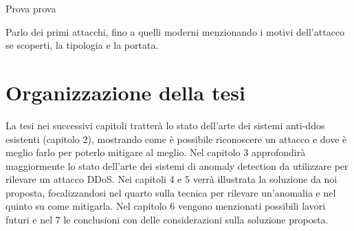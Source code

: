 
Prova prova

Parlo dei primi attacchi, fino a quelli moderni menzionando i motivi dell'attacco se scoperti, la tipologia e la portata.


\section{Organizzazione della tesi}

La tesi nei successivi capitoli tratterà lo stato dell'arte dei sistemi anti-ddos esistenti (capitolo 2), mostrando come è possibile riconoscere un attacco e dove è meglio farlo per poterlo mitigare al meglio. Nel capitolo 3 approfondirà maggiormente lo stato dell'arte dei sistemi di anomaly detection da utilizzare per rilevare un attacco DDoS.
Nei capitoli 4 e 5 verrà illustrata la soluzione da noi proposta, focalizzandosi nel quarto sulla tecnica per rilevare un'anomalia e nel quinto su come mitigarla.
Nel capitolo 6 vengono menzionati possibili lavori futuri e nel 7 le conclusioni con delle considerazioni sulla soluzione proposta.